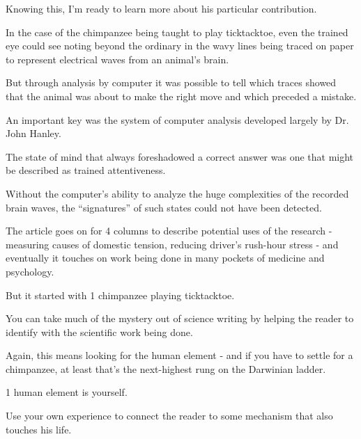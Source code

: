 \documentclass{book}
\numberwithin{equation}{section}
\begin{document}
Knowing this, I'm ready to learn more about his particular contribution.

%
In the case of the chimpanzee being taught to play ticktacktoe, even the trained eye could see noting beyond the ordinary in the wavy lines being traced on paper to represent electrical waves from an animal's brain.

But through analysis by computer it was possible to tell which traces showed that the animal was about to make the right move and which preceded a mistake.

%
An important key was the system of computer analysis developed largely by Dr. John Hanley.

The state of mind that always foreshadowed a correct answer was one that might be described as trained attentiveness.

Without the computer's ability to analyze the huge complexities of the recorded brain waves, the ``signatures'' of such states could not have been detected.

%
The article goes on for 4 columns to describe potential uses of the research - measuring causes of domestic tension, reducing driver's rush-hour stress - and eventually it touches on work being done in many pockets of medicine and psychology.

But it started with 1 chimpanzee playing ticktacktoe.

%
You can take much of the mystery out of science writing by helping the reader to identify with the scientific work being done.

Again, this means looking for the human element - and if you have to settle for a chimpanzee, at least that's the next-highest rung on the Darwinian ladder.

1 human element is yourself.

Use your own experience to connect the reader to some mechanism that also touches his life.
\end{document}
